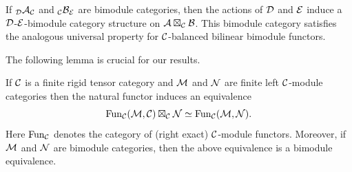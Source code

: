 \documentclass{amsart}
\begin{document}
\begin{remark}
	If ${}_{\mathcal D}\mathcal A_{\mathcal C}$ and ${}_{\mathcal C}\mathcal B_{\mathcal E}$ are bimodule categories, then the actions of $\mathcal D$ and $\mathcal E$ induce a $\mathcal D$-$\mathcal E$-bimodule category structure on $\mathcal A \boxtimes_{\mathcal C} \mathcal B$. This bimodule category satisfies the analogous universal property for $\mathcal C$-balanced bilinear bimodule functors. 
\end{remark}

The following lemma is crucial for our results.

\begin{lemma} \label{Lma:FunctorsAsATensorPdt}
	If $\mathcal C$ is a finite rigid tensor category and $\mathcal M$ and $\mathcal N$ are finite left $\mathcal C$-module categories then the natural functor induces an equivalence
	\begin{equation*}
		\operatorname{Fun}_\mathcal C(\mathcal M, \mathcal C) \boxtimes_\mathcal C \mathcal N \simeq \operatorname{Fun}_\mathcal C(\mathcal M,\mathcal N).
	\end{equation*}
	Here $\operatorname{Fun}_\mathcal C$ denotes the category of (right exact) $\mathcal C$-module functors. 
	Moreover, if $\mathcal M$ and $\mathcal N$ are bimodule categories, then the above equivalence is a bimodule equivalence. 
\end{lemma}
\end{document}
